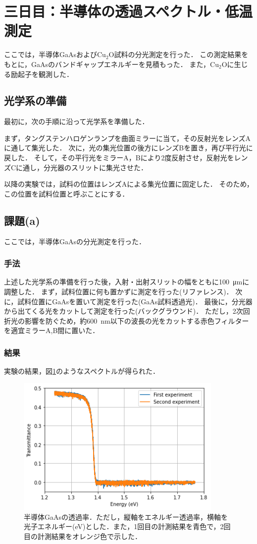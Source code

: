 \documentclass[titlepage]{jsarticle}
\begin{document}
\section{三日目：半導体の透過スペクトル・低温測定}
ここでは，半導体GaAsおよびCu$_2$O試料の分光測定を行った．
この測定結果をもとに，GaAsのバンドギャップエネルギーを見積もった．
また，Cu$_2$Oに生じる励起子を観測した．

\subsection{光学系の準備}
最初に，次の手順に沿って光学系を準備した．

まず，タングステンハロゲンランプを曲面ミラーに当て，その反射光をレンズAに通して集光した．
次に，光の集光位置の後方にレンズBを置き，再び平行光に戻した．
そして，その平行光をミラーA，Bにより2度反射させ，反射光をレンズCに通し，分光器のスリットに集光させた．

以降の実験では，試料の位置はレンズAによる集光位置に固定した．
そのため，この位置を試料位置と呼ぶことにする．

\subsection{課題(a)}
ここでは，半導体GaAsの分光測定を行った．

\subsubsection{手法}
上述した光学系の準備を行った後，入射・出射スリットの幅をともに\SI{100}{\um}に調整した．
まず，試料位置に何も置かずに測定を行った(リファレンス)．
次に，試料位置にGaAsを置いて測定を行った(GaAs試料透過光)．
最後に，分光器から出てくる光をカットして測定を行った(バックグラウンド)．
ただし，2次回折光の影響を防ぐため，約\SI{600}{\nm}以下の波長の光をカットする赤色フィルターを適宜ミラーA,B間に置いた．

\subsubsection{結果}
実験の結果，図\ref{fig:GaAs}のようなスペクトルが得られた．

\begin{figure}[htbp]
  \centering
  \includegraphics[width=10cm]{GaAs.png}
  \caption{半導体GaAsの透過率．ただし，縦軸をエネルギー透過率，横軸を光子エネルギー(eV)とした．また，1回目の計測結果を青色で，2回目の計測結果をオレンジ色で示した．}
  \label{fig:GaAs}
\end{figure}
\end{document}
